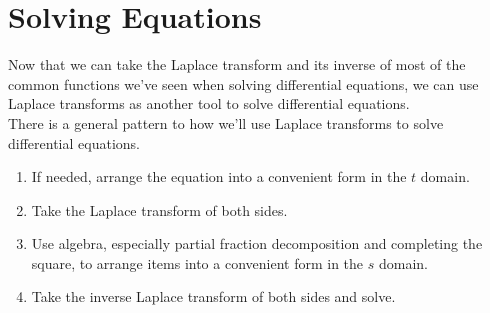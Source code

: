 \section{Solving Equations}
\noindent
Now that we can take the Laplace transform and its inverse of most of the common functions we've seen when solving differential equations, we can use Laplace transforms as another tool to solve differential equations.\\

\noindent
There is a general pattern to how we'll use Laplace transforms to solve differential equations.
\begin{enumerate}[label=\arabic*)]
	\item If needed, arrange the equation into a convenient form in the $t$ domain.
	\item Take the Laplace transform of both sides.
	\item Use algebra, especially partial fraction decomposition and completing the square, to arrange items into a convenient form in the $s$ domain.
	\item Take the inverse Laplace transform of both sides and solve.
\end{enumerate}

